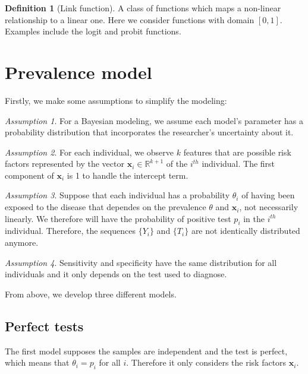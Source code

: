 \documentclass[a4paper, notitlepage, 11pt]{article}
\newcommand{\R}{\mathbb{R}}
\newcommand{\x}{\boldsymbol{x}}
\theoremstyle{definition}
\newtheorem{definition}{Definition}[section]
\theoremstyle{remark}
\newtheorem{assumption}{Assumption}
\begin{document}
\begin{definition}[Link function]
  A class of functions which maps a non-linear relationship to a linear one.
  Here we consider functions with domain $[0,1]$. Examples include the logit and probit
functions.
\end{definition}

\section{Prevalence model}

Firstly, we make some assumptions to simplify the modeling:

\begin{assumption}
  For a Bayesian modeling, we assume each model's parameter has a probability distribution that incorporates the researcher's uncertainty about it. 
\end{assumption}

\begin{assumption}
  For each individual, we observe $k$ features that are possible
  risk factors represented by the vector $\x_i \in \R^{k+1}$ of the $i^{th}$ individual. The
  first component of $\x_i$ is 1 to handle the intercept term. 
\end{assumption}

\begin{assumption}
  Suppose that each individual has a probability $\theta_i$ of having been exposed
  to the disease that dependes on the prevalence $\theta$ and $\x_i$, not necessarily linearly.
  We therefore will have the probability of positive test $p_i$ in the
  $i^{th}$ individual. Therefore, the sequences $\{Y_i\}$ and $\{T_i\}$ are not
  identically distributed anymore.
\end{assumption} 

\begin{assumption}
  Sensitivity and specificity have the same distribution for all
  individuals and it only depends on the test used to diagnose. 
\end{assumption}

From above, we develop three different models.

\subsection{Perfect tests}

The first model supposes the samples are independent and the test is perfect,
which means that $\theta_i = p_i$ for all $i$. Therefore it only considers the risk factors $\x_i$. 
\end{document}
